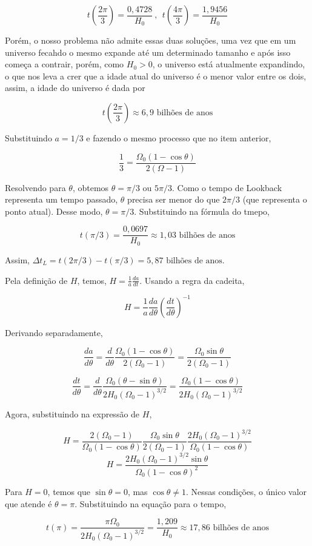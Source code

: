 \documentclass[11pt]{article}
\begin{document}
\begin{pproblem}
\begin{pssolution*}{}{}
\begin{alternativas}
        \[t\left(\frac{2\pi}{3}\right) = \frac{0,4728}{H_0} \ , \ \ t\left(\frac{4\pi}{3}\right) = \frac{1,9456}{H_0}\]

        Porém, o nosso problema não admite essas duas soluções, uma vez que em um universo fecahdo o mesmo expande até um determinado tamanho e após isso começa a contrair, porém, como \(H_0>0\), o universo está atualmente expandindo, o que nos leva a crer que a idade atual do universo é o menor valor entre os dois, assim, a idade do universo é dada por 

        \[\boxed{t\left(\frac{2\pi}{3}\right)\approx 6,9 \text{ bilhões de anos}}\]

        \item Substituindo \(a=1/3\) e fazendo o mesmo processo que no item anterior, 
        
        \[\frac{1}{3} = \frac{\Omega_0(1-\cos\theta)}{2(\Omega-1)}\]

        Resolvendo para \(\theta\), obtemos \(\theta = \pi/3 \) ou \(5\pi/3\). Como o tempo de Lookback representa um tempo passado, \(\theta\) precisa ser menor do que \(2\pi/3\) (que representa o ponto atual). Desse modo, \(\theta = \pi/3\). Substituindo na fórmula do tmepo, 

        \[t(\pi/3) = \frac{0,0697}{H_0} \approx 1,03 \text{ bilhões de anos}\]

        Assim, \(\boxed{\Delta t_L = t(2\pi/3) - t(\pi/3) = 5,87 \text{ bilhões de anos.}}\)

        \item Pela definição de \(H\), temos, \(H = \frac{1}{a}\frac{da}{dt}\). Usando a regra da cadeita, 
        
        \[H = \frac{1}{a}\frac{d a}{d\theta}\left(\frac{dt}{d\theta}\right)^{-1}\]

        Derivando separadamente, 

        \[\frac{da}{d\theta} = \frac{d}{d\theta}\frac{\Omega_0(1-\cos\theta)}{2(\Omega_0-1)} = \frac{\Omega_0\sin\theta}{2(\Omega_0-1)}\]

        \[\frac{dt}{d\theta} = \frac{d}{d\theta}\frac{\Omega_0(\theta-\sin\theta)}{2H_0(\Omega_0-1)^{3/2}} = \frac{\Omega_0(1-\cos\theta)}{2H_0(\Omega_0-1)^{3/2}}\]

        Agora, substituindo na expressão de \(H\), 

        \[H = \frac{2(\Omega_0-1)}{\Omega_0(1-\cos\theta)}\frac{\Omega_0\sin\theta}{2(\Omega_0-1)}\frac{2H_0(\Omega_0-1)^{3/2}}{\Omega_0(1-\cos\theta)}\]
        \[H = \frac{2H_0(\Omega_0-1)^{3/2}\sin\theta}{\Omega_0(1-\cos\theta)^2}\]

        Para \(H=0\), temos que \(\sin\theta = 0\), mas \(\cos\theta \ne 1\). Nessas condições, o único valor que atende é \(\boxed{\theta = \pi}\). Substituindo na equação para o tempo, 

        \[\boxed{t(\pi) = \frac{\pi\Omega_0}{2H_0(\Omega_0-1)^{3/2}}= \frac{1,209}{H_0} \approx 17,86 \text{ bilhões de anos}}\]

    \end{alternativas}
\end{pssolution*}
\end{pproblem}
\end{document}
